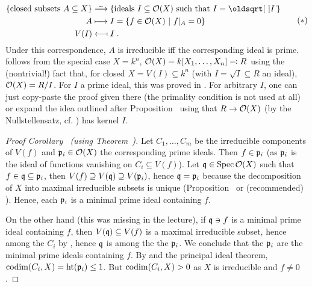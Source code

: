 \documentclass[a4paper,parskip=half,numbers=enddot, DIV=12]{scrreprt}
\begin{document}
\begin{rem}
\begin{alphanumerate}
        \begin{align}\lbl{eq:bijectiveCorrespondenceO(X)}
	        \begin{split}
		        \{\text{closed subsets }A\subseteq X\}&\isomorphism\left\{\text{ideals }I\subseteq \Oo(X)\text{ such that }I=\sqrt{I}\right\}\\
		        A&\longmapsto I=\left\{f\in \Oo(X)\st f|_A=0\right\}\\
		        V(I)&\longmapsfrom I\;.
	        \end{split}\tag{$*$}
        \end{align}
        Under this correspondence, $A$ is irreducible iff the corresponding ideal is prime.  follows from the special case $X=k^n$, $\mathcal{O}(X)=k[X_1,\ldots,X_n]\eqqcolon R$ using the (nontrivial!) fact that, for closed $X=V(I)\subseteq k^n$ (with $I=\sqrt{I}\subseteq R$ an ideal), $\mathcal{O}(X)=R/I$. For $I$ a prime ideal, this was proved in \cite[Proposition~2.2.2]{alg1}. For arbitrary $I$, one can just copy-paste the proof given there (the primality condition is not used at all) or expand the idea outlined after Proposition~ using that $R\to\mathcal{O}(X)$ (by the Nullstellensatz, cf. \cite[Proposition~1.7.1]{alg1}) has kernel $I$.
    \end{alphanumerate}
\end{rem}
\begin{proof}[Proof Corollary~ (using Theorem~)]
	Let $C_1,\ldots,C_m$ be the irreducible components of $V(f)$ and $\mathfrak{p}_i\in\mathcal{O}(X)$ the corresponding prime ideals. Then $f\in\mathfrak{p}_i$ (as $\mathfrak{p}_i$ is the ideal of functions vanishing on $C_i\subseteq V(f)$). Let $\mathfrak{q}\in\operatorname{Spec}\mathcal{O}(X)$ such that $f\in\mathfrak{q}\subseteq\mathfrak{p}_i$, then $V(f)\supseteq V(\mathfrak{q})\supseteq V(\mathfrak{p}_i)$, hence $\mathfrak{q}=\mathfrak{p}_i$ because the decomposition of $X$ into maximal irreducible subsets is unique (Proposition~ or (recommended) \cite[Proposition~2.1.1]{alg1}). Hence, each $\mathfrak{p}_i$ is a minimal prime ideal containing $f$.
	
	On the other hand (this was missing in the lecture), if $\mathfrak{q}\ni f$ is a minimal prime ideal containing $f$, then $V(\mathfrak{q})\subseteq V(f)$ is a maximal irreducible subset, hence among the $C_i$ by \cite[Proposition~2.1.1]{alg1}, hence $\mathfrak{q}$ is among the the $\mathfrak{p}_i$. We conclude that the $\mathfrak{p}_i$ are the minimal prime ideals containing $f$. By  and the principal ideal theorem, $\operatorname{codim}(C_i,X)=\operatorname{ht}(\mathfrak{p}_i)\leq1$. But $\operatorname{codim}(C_i,X)>0$ as $X$ is irreducible and $f\not=0$.
\end{proof}
\end{document}
